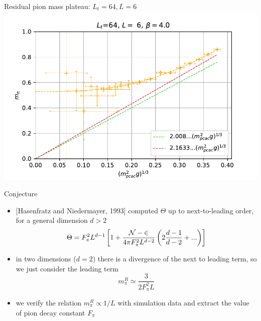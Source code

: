 \documentclass[english]{beamer}
\begin{document}
\begin{frame}{Residual pion mass plateau: $L_t = 64, L = 6$}
  \includegraphics[width=1\textwidth]{figs/Mpi6x64Pt10}
\end{frame}

\begin{frame}{Conjecture}
  \begin{itemize}
    \item {[Hasenfratz and Niedermayer, 1993]} computed $\Theta$
      up to next-to-leading order, for a general dimension $d > 2$
            \[
        \Theta = F_\pi^2 L^{d-1} \left[1 +
          \frac{\cal{N} - 2}{4\pi F_\pi^2 L^{d-2}}
          \left(2\frac{d - 1}{d - 2} + ...\right) \right]
      \]
    \item in two dimensions ($d = 2$) there is a divergence of 
      the next to leading term, so we just consider the 
      leading term
      \[
        m_\pi^R \simeq \frac{3}{2F_\pi^2 L}
      \]
    \item we verify the relation $m_\pi^R \propto 1 / L$ with
      simulation data and extract the value of pion decay
      constant $F_\pi$
  \end{itemize}
\end{frame}
\end{document}
